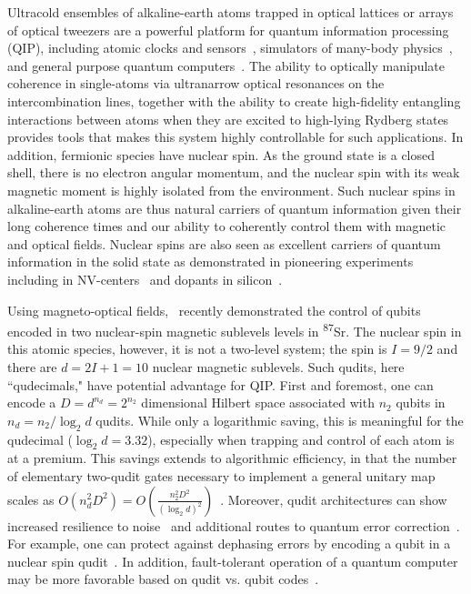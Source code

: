 \documentclass[aps,prl,twocolumn,reprint,superscriptaddress,footinbib]{revtex4-2}
\begin{document}
Ultracold ensembles of alkaline-earth atoms trapped in optical lattices or arrays of optical tweezers are a powerful platform for quantum information processing (QIP), including atomic clocks and sensors~\cite{Ludlow2015, campbell2017fermi, norcia2019seconds, covey20192000, young2020half}, simulators of many-body physics~\cite{gorshkov2010two, daley2011quantum, mukherjee2011many,banerjee2013atomic,isaev2016spin, kolkowitz2017spin}, and general purpose quantum computers~\cite{madjarov2020high,daley2011quantum,hayes2007quantum}.  The ability to optically manipulate coherence in single-atoms  via ultranarrow optical resonances on the intercombination lines, together with the ability to create high-fidelity entangling interactions between atoms when they are excited to high-lying Rydberg states~\cite{Saffman2010,Saffman_2016,Browaeys_2016} provides tools that makes this system highly controllable for such applications.  In addition, fermionic species have nuclear spin. As the ground state is a closed shell, there is no electron angular momentum, and the nuclear spin with its weak magnetic moment is highly isolated from the environment.  Such nuclear spins in alkaline-earth atoms are thus natural carriers of quantum information given their long coherence times and our ability to coherently control them with magnetic and optical  fields.  Nuclear spins are also seen as excellent carriers of quantum information in the solid state as demonstrated in pioneering experiments including in NV-centers~\cite{morishita2020} and dopants in silicon~\cite{soltamov2019,morello2018quantum,Godfrin2017,Leuenberger2003}.  

Using magneto-optical fields,~\cite{Lester2021} recently demonstrated the control of qubits encoded in  two nuclear-spin magnetic sublevels levels in  \textsuperscript{87}Sr. The nuclear spin in this atomic species, however, it is not a two-level system; the spin is $I=9/2$ and there are $d=2I+1=10$ nuclear magnetic sublevels.  Such qudits,  here  ``qudecimals," have potential advantage for QIP.  First and foremost, one can encode a $D=d^{n_d}=2^{n_2}$ dimensional Hilbert space associated with $n_2$ qubits in $n_d=n_2/\log_2 d$ qudits.  While only a logarithmic saving, this is meaningful for the qudecimal ($\log_2 d= 3.32$), especially when trapping and control of each atom is at a premium. This savings extends to algorithmic efficiency, in that the number of elementary two-qudit gates necessary to implement a  general unitary map scales as $O(n_d^2 D^2) = O\left( \frac{n_2^2 D^2}{(\log_2 d)^2} \right)$~\cite{muthukrishnan2000multivalued}.  Moreover, qudit architectures can show increased resilience to noise~\cite{cozzolino2019high} and additional routes to quantum error correction~\cite{gottesman1998fault}. For example, one can protect against dephasing errors by encoding a qubit in a nuclear spin qudit~\cite{Li2017}.  In addition, fault-tolerant operation of a quantum computer may be more favorable based on qudit vs. qubit codes~\cite{PhysRevA.83.032310,campbell2014}.
\end{document}
